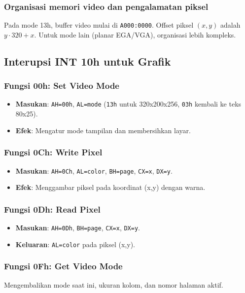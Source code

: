 \documentclass[../main.tex]{subfiles}
\begin{document}
\subsubsection{Organisasi memori video dan pengalamatan piksel}
Pada mode 13h, buffer video mulai di \texttt{A000:0000}. Offset piksel \((x,y)\) adalah \(y\cdot 320 + x\). Untuk mode lain (planar EGA/VGA), organisasi lebih kompleks.

\subsection{Interupsi INT 10h untuk Grafik}
\subsubsection{Fungsi 00h: Set Video Mode}
\begin{itemize}
  \item \textbf{Masukan}: \texttt{AH=00h}, \texttt{AL=mode} (\texttt{13h} untuk 320x200x256, \texttt{03h} kembali ke teks 80x25).
  \item \textbf{Efek}: Mengatur mode tampilan dan membersihkan layar.
\end{itemize}

\subsubsection{Fungsi 0Ch: Write Pixel}
\begin{itemize}
  \item \textbf{Masukan}: \texttt{AH=0Ch}, \texttt{AL=color}, \texttt{BH=page}, \texttt{CX=x}, \texttt{DX=y}.
  \item \textbf{Efek}: Menggambar piksel pada koordinat (x,y) dengan warna.
\end{itemize}

\subsubsection{Fungsi 0Dh: Read Pixel}
\begin{itemize}
  \item \textbf{Masukan}: \texttt{AH=0Dh}, \texttt{BH=page}, \texttt{CX=x}, \texttt{DX=y}.
  \item \textbf{Keluaran}: \texttt{AL=color} pada piksel (x,y).
\end{itemize}

\subsubsection{Fungsi 0Fh: Get Video Mode}
Mengembalikan mode saat ini, ukuran kolom, dan nomor halaman aktif.
\end{document}
